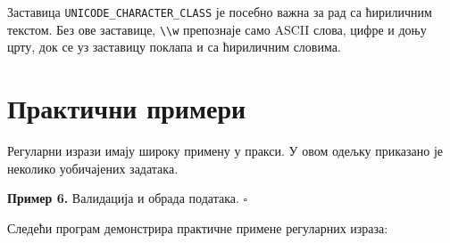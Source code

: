 Заставица \texttt{UNICODE\_CHARACTER\_CLASS} је посебно важна за рад са ћириличним текстом. Без ове заставице, \texttt{\textbackslash{}\textbackslash{}w} препознаје само ASCII слова, цифре и доњу црту, док се уз заставицу поклапа и са ћириличним словима.


\section{Практични примери}

Регуларни изрази имају широку примену у пракси. У овом одељку приказано је неколико уобичајених задатака.


\bigskip

\noindent \textbf{Пример 6.} Валидација и обрада података. $\square$

\medskip

Следећи програм демонстрира практичне примене регуларних израза:


